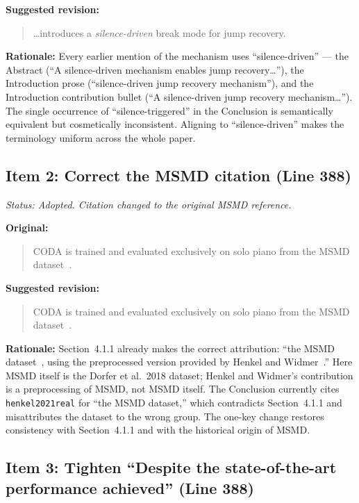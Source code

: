 \documentclass{article}
\begin{document}
\textbf{Suggested revision:}
\begin{quote}
\ldots introduces a \emph{silence-driven} break mode for jump recovery.
\end{quote}

\textbf{Rationale:}
Every earlier mention of the mechanism uses ``silence-driven'' --- the Abstract (``A silence-driven mechanism enables jump recovery\ldots''), the Introduction prose (``silence-driven jump recovery mechanism''), and the Introduction contribution bullet (``A silence-driven jump recovery mechanism\ldots''). The single occurrence of ``silence-triggered'' in the Conclusion is semantically equivalent but cosmetically inconsistent. Aligning to ``silence-driven'' makes the terminology uniform across the whole paper.

\subsection*{Item 2: Correct the MSMD citation (Line 388)}

\textit{Status: Adopted. Citation changed to the original MSMD reference.}

\textbf{Original:}
\begin{quote}
CODA is trained and evaluated exclusively on solo piano from the MSMD dataset~\cite{henkel2021real}.
\end{quote}

\textbf{Suggested revision:}
\begin{quote}
CODA is trained and evaluated exclusively on solo piano from the MSMD dataset~\cite{dorfer2018learning}.
\end{quote}

\textbf{Rationale:}
Section~4.1.1 already makes the correct attribution: ``the MSMD dataset~\cite{dorfer2018learning}, using the preprocessed version provided by Henkel and Widmer~\cite{henkel2021real}.'' Here MSMD itself is the Dorfer et al.\ 2018 dataset; Henkel and Widmer's contribution is a preprocessing of MSMD, not MSMD itself. The Conclusion currently cites \texttt{henkel2021real} for ``the MSMD dataset,'' which contradicts Section~4.1.1 and misattributes the dataset to the wrong group. The one-key change restores consistency with Section~4.1.1 and with the historical origin of MSMD.

\subsection*{Item 3: Tighten ``Despite the state-of-the-art performance achieved'' (Line 388)}
\end{document}
